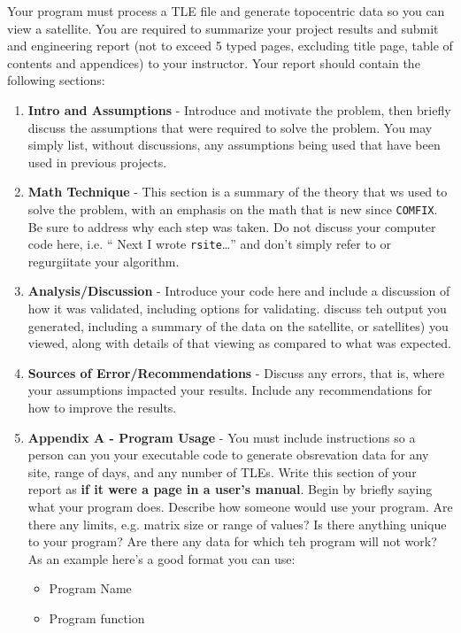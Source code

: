 \documentclass[11pt, reqno]{article}    %
\begin{document}
Your program must process a TLE file and generate topocentric data so you can view a satellite.
You are required to summarize your project results and submit and engineering report (not to exceed \num{5} typed pages, excluding title page, table of contents and appendices) to your instructor.
Your report should contain the following sections:
\begin{enumerate}
    \item \textbf{Intro and Assumptions} - Introduce and motivate the problem, then briefly discuss the assumptions that were required to solve the problem. 
        You may simply list, without discussions, any assumptions being used that have been used in previous projects.
    \item \textbf{Math Technique} - This section is a summary of the theory that ws used to solve the problem, with an emphasis on the math that is new since \texttt{COMFIX}. 
        Be sure to address why each step was taken. 
        Do not discuss your computer code here, i.e. `` Next I wrote \texttt{rsite}\ldots'' and don't simply refer to or regurgiitate your algorithm.
    \item \textbf{Analysis/Discussion} - Introduce your code here and include a discussion of how it was validated, including options for validating.
        discuss teh output you generated, including a summary of the data on the satellite, or satellites) you viewed, along with details of that viewing as compared to what was expected.
    \item \textbf{Sources of Error/Recommendations} - Discuss any errors, that is, where your assumptions impacted your results. 
        Include any recommendations for how to improve the results.
    \item \textbf{Appendix A - Program Usage} - You must include instructions so a person can you your executable code to generate obsrevation data for any site, range of days, and any number of TLEs.
        Write this section of your report as \textbf{if it were a page in a user's manual}.
        Begin by briefly saying what your program does.
        Describe how someone would use your program.
        Are there any limits, e.g. matrix size or range of values?
        Is there anything unique to your program?
        Are there any data for which teh program will not work?
        As an example here's a good format you can use:
        \begin{itemize}
            \item Program Name
            \item Program function

\end{itemize}
\end{enumerate}
\end{document}
